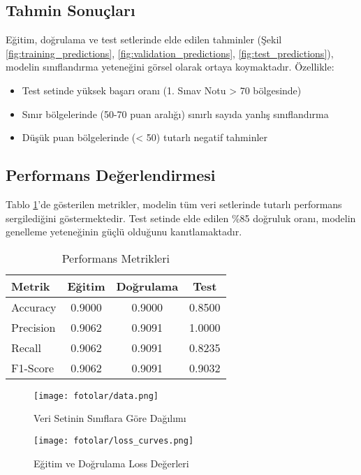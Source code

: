 \documentclass[conference]{IEEEtran}
\begin{document}
\subsection{Tahmin Sonuçları}
Eğitim, doğrulama ve test setlerinde elde edilen tahminler (Şekil
\ref{fig:training_predictions}, \ref{fig:validation_predictions},
\ref{fig:test_predictions}), modelin sınıflandırma yeteneğini görsel olarak
ortaya koymaktadır. Özellikle:

\begin{itemize}
\item Test setinde yüksek başarı oranı (1. Sınav Notu > 70 bölgesinde)
\item Sınır bölgelerinde (50-70 puan aralığı) sınırlı sayıda yanlış sınıflandırma
\item Düşük puan bölgelerinde (< 50) tutarlı negatif tahminler
\end{itemize}

\subsection{Performans Değerlendirmesi}
Tablo \ref{tab:performance}'de gösterilen metrikler, modelin tüm veri
setlerinde tutarlı performans sergilediğini göstermektedir. Test setinde elde
edilen \%85 doğruluk oranı, modelin genelleme yeteneğinin güçlü olduğunu
kanıtlamaktadır.

\begin{table}[!t]
\caption{Performans Metrikleri}
\label{tab:performance}
\centering
\begin{tabular}{|l|c|c|c|}
\hline
\textbf{Metrik} & \textbf{Eğitim} & \textbf{Doğrulama} & \textbf{Test} \\
\hline
Accuracy & 0.9000 & 0.9000 & 0.8500 \\
Precision & 0.9062 & 0.9091 & 1.0000 \\
Recall & 0.9062 & 0.9091 & 0.8235 \\
F1-Score & 0.9062 & 0.9091 & 0.9032 \\
\hline
\end{tabular}
\end{table}

\newpage

\begin{figure}
\centering
\texttt{[image: fotolar/data.png]}
\caption{Veri Setinin Sınıflara Göre Dağılımı}
\label{fig:data_distribution}
\end{figure}

\begin{figure}
\centering
\texttt{[image: fotolar/loss\_curves.png]}
\caption{Eğitim ve Doğrulama Loss Değerleri}
\label{fig:loss_curves}
\end{figure}
\end{document}
